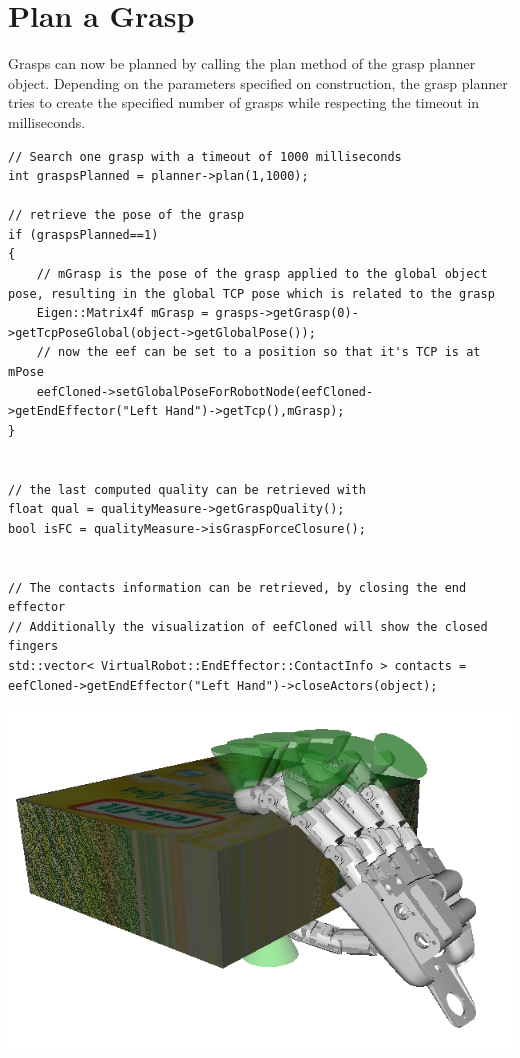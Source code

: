 \documentclass{book}
\begin{document}
\section{Plan a Grasp}
Grasps can now be planned by calling the plan method of the grasp planner object. Depending on the parameters specified on construction, the grasp planner tries to create the specified number of grasps while respecting the timeout in milliseconds. 
\begin{lstlisting}
// Search one grasp with a timeout of 1000 milliseconds
int graspsPlanned = planner->plan(1,1000);

// retrieve the pose of the grasp
if (graspsPlanned==1)
{
    // mGrasp is the pose of the grasp applied to the global object pose, resulting in the global TCP pose which is related to the grasp
    Eigen::Matrix4f mGrasp = grasps->getGrasp(0)->getTcpPoseGlobal(object->getGlobalPose());
    // now the eef can be set to a position so that it's TCP is at mPose 
    eefCloned->setGlobalPoseForRobotNode(eefCloned->getEndEffector("Left Hand")->getTcp(),mGrasp);
}


// the last computed quality can be retrieved with
float qual = qualityMeasure->getGraspQuality();
bool isFC = qualityMeasure->isGraspForceClosure();


// The contacts information can be retrieved, by closing the end effector
// Additionally the visualization of eefCloned will show the closed fingers
std::vector< VirtualRobot::EndEffector::ContactInfo > contacts = eefCloned->getEndEffector("Left Hand")->closeActors(object);
\end{lstlisting}
\includegraphics[width=\textwidth]{GraspPlanner1}
\end{document}
